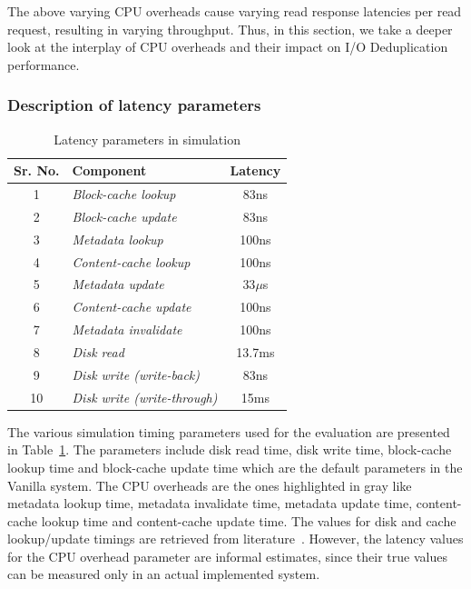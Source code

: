 The above varying
CPU overheads cause varying read response latencies per read request,
resulting in varying throughput.
Thus, in this section, we take a deeper look
at the interplay of CPU overheads and their impact on I/O Deduplication
performance. 

\subsubsection{Description of latency parameters}
\begin{table}
\caption{Latency parameters in simulation}
\label{tab:simul-params}
\centering
\begin{tabular}{|c|l|c|} \hline
\textbf{Sr. No.} & \textbf{Component} & Latency \\ \hline
1 & \textit{Block-cache lookup} & 83ns \\
2 & \textit{Block-cache update} & 83ns \\
\rowcolor{Gray} 3 & \textit{Metadata lookup} & 100ns \\
\rowcolor{Gray} 4 & \textit{Content-cache lookup} & 100ns \\
\rowcolor{Gray} 5 & \textit{Metadata update} & 33$\mu$s \\
\rowcolor{Gray} 6 & \textit{Content-cache update} & 100ns \\
\rowcolor{Gray} 7 & \textit{Metadata invalidate} & 100ns \\
8 & \textit{Disk read} & 13.7ms \\
9 & \textit{Disk write (write-back)} & 83ns \\ 
10 & \textit{Disk write (write-through)} & 15ms \\ \hline
\end{tabular}
\end{table}


The various simulation timing parameters used for the evaluation are presented
in Table~\ref{tab:simul-params}. The parameters include disk read
time, disk write time, block-cache lookup time and block-cache update time
which are the default parameters in the Vanilla system. The CPU overheads are
the ones highlighted in gray like metadata lookup time, metadata invalidate time,
metadata update time, content-cache lookup time and content-cache update time.
The values for disk and cache lookup/update timings are retrieved 
from literature~\cite{gustavo-blogpost, rules-of-thumb}. However, the latency values for the
CPU overhead parameter are informal estimates, since their true values can be 
measured only in an actual implemented system.


